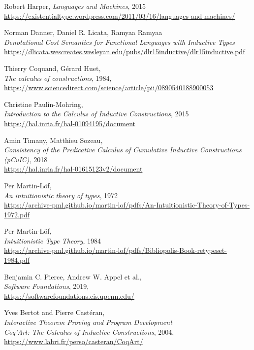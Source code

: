 \documentclass[declaration,mgr,english,shortabstract]{iithesis}
\begin{document}
\begin{thebibliography}{1}
    Robert Harper, \textit{Languages and Machines}, 2015 \\
    \url{https://existentialtype.wordpress.com/2011/03/16/languages-and-machines/}

    Norman Danner, Daniel R. Licata, Ramyaa Ramyaa \\
    \textit{Denotational Cost Semantics for
    Functional Languages with Inductive Types} \\
    \url{https://dlicata.wescreates.wesleyan.edu/pubs/dlr15inductive/dlr15inductive.pdf}

    Thierry Coquand, Gérard Huet, \\
    \textit{The calculus of constructions}, 1984, \\
    \url{https://www.sciencedirect.com/science/article/pii/0890540188900053}

    Christine Paulin-Mohring, \\
    \textit{Introduction to the Calculus of Inductive Constructions}, 2015 \\
    \url{https://hal.inria.fr/hal-01094195/document}

    Amin Timany, Matthieu Sozeau, \\
    \textit{Consistency of the Predicative Calculus of Cumulative
    Inductive Constructions (pCuIC)}, 2018 \\
    \url{https://hal.inria.fr/hal-01615123v2/document}

    Per Martin-L\"{o}f, \\
    \textit{An intuitionistic theory of types}, 1972 \\
    \url{https://archive-pml.github.io/martin-lof/pdfs/An-Intuitionistic-Theory-of-Types-1972.pdf}

    Per Martin-L\"{o}f, \\
    \textit{Intuitionistic Type Theory}, 1984 \\
    \url{https://archive-pml.github.io/martin-lof/pdfs/Bibliopolis-Book-retypeset-1984.pdf}
    
    Benjamin C. Pierce, Andrew W. Appel et al., \\
    \textit{Software Foundations}, 2019, \\
    \url{https://softwarefoundations.cis.upenn.edu/}

    Yves Bertot and Pierre Castéran, \\
    \textit{Interactive Theorem Proving and Program Development \\ Coq'Art: The Calculus of Inductive Constructions}, 2004, \\
    \url{https://www.labri.fr/perso/casteran/CoqArt/}


\end{thebibliography}
\end{document}
